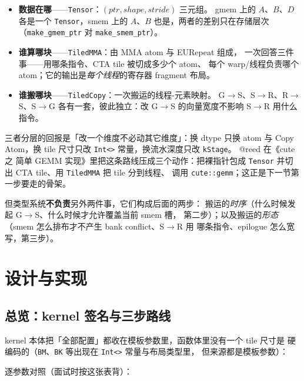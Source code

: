 \begin{itemize}
  \item \textbf{数据在哪}——\texttt{Tensor}：$(ptr, shape, stride)$ 三元组。
        gmem 上的 $A$、$B$、$D$ 各是一个 \texttt{Tensor}，smem 上的 $A$、$B$
        也是，两者的差别只在存储层次（\texttt{make\_\allowbreak{}gmem\_\allowbreak{}ptr} 对
        \texttt{make\_\allowbreak{}smem\_\allowbreak{}ptr}）。
  \item \textbf{谁算哪块}——\texttt{TiledMMA}：由 MMA atom 与 EURepeat 组成，
        一次回答三件事——用哪条指令、CTA tile 被切成多少个 atom、
        每个 warp/线程负责哪个 atom；它的输出是\emph{每个线程}的寄存器
        fragment 布局。
  \item \textbf{谁搬哪块}——\texttt{TiledCopy}：一次搬运的线程-元素映射。
        G$\to$S、S$\to$R、R$\to$S、S$\to$G 各有一套，彼此独立：改 G$\to$S
        的向量宽度不影响 S$\to$R 用什么指令。
\end{itemize}

三者分层的回报是「改一个维度不必动其它维度」：换 dtype 只换 atom 与 Copy
Atom，换 tile 尺寸只改 \texttt{Int<>} 常量，换流水深度只改 \texttt{kStage}。
@reed 在《cute 之 简单 GEMM 实现》里把这条路线压成三个动作：把裸指针包成
\texttt{Tensor} 并切出 CTA tile、用 \texttt{TiledMMA} 把 tile 分到线程、
调用 \texttt{cute::gemm}；这正是下一节第一步要走的骨架。

但类型系统\textbf{不负责}另外两件事，它们构成后面的两步：
搬运的\emph{时序}（什么时候发起 G$\to$S、什么时候才允许覆盖当前 smem 槽，
第二步）；以及搬运的\emph{形态}（smem 怎么排布才不产生 bank conflict、S$\to$R 用
哪条指令、epilogue 怎么宽写，第三步）。

\section{设计与实现}

\subsection{总览：kernel 签名与三步路线}\label{sec:24-overview}

kernel 本体把「全部配置」都收在模板参数里，函数体里没有一个 tile 尺寸是
硬编码的（\texttt{BM}、\texttt{BK} 等出现在 \texttt{Int<>} 常量与布局类型里，
但来源都是模板参数）：



逐参数对照（面试时按这张表背）：

